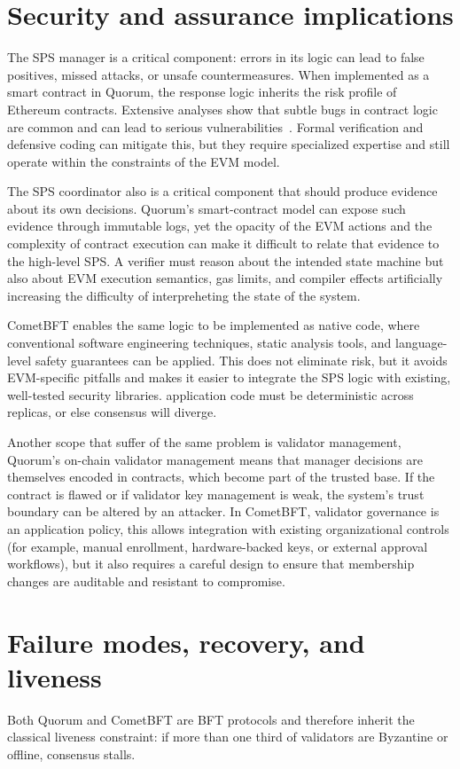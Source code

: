 \section{Security and assurance implications}
The SPS manager is a critical component: errors in its logic can lead to false positives, missed attacks, or unsafe countermeasures. When implemented as a smart contract in Quorum, the response logic inherits the risk profile of Ethereum contracts. Extensive analyses show that subtle bugs in contract logic are common and can lead to serious vulnerabilities~\cite{atzei2017survey, kushwaha2022systematic}. Formal verification and defensive coding can mitigate this, but they require specialized expertise and still operate within the constraints of the EVM model.

 The SPS coordinator also is a critical component that should produce evidence about its own decisions. Quorum's smart-contract model can expose such evidence through immutable logs, yet the opacity of the EVM actions and the complexity of contract execution can make it difficult to relate that evidence to the high-level SPS. A verifier must reason about the intended state machine but also about EVM execution semantics, gas limits, and compiler effects artificially increasing the difficulty of interpreheting the state of the system.

CometBFT enables the same logic to be implemented as native code, where conventional software engineering techniques, static analysis tools, and language-level safety guarantees can be applied. This does not eliminate risk, but it avoids EVM-specific pitfalls and makes it easier to integrate the SPS logic with existing, well-tested security libraries. application code must be deterministic across replicas, or else consensus will diverge.

Another scope that suffer of the same problem is validator management, Quorum's on-chain validator management means that manager decisions are themselves encoded in contracts, which become part of the trusted base. If the contract is flawed or if validator key management is weak, the system's trust boundary can be altered by an attacker. In CometBFT, validator governance is an application policy, this allows integration with existing organizational controls (for example, manual enrollment, hardware-backed keys, or external approval workflows), but it also requires a careful design to ensure that membership changes are auditable and resistant to compromise.

\section{Failure modes, recovery, and liveness}
Both Quorum and CometBFT are BFT protocols and therefore inherit the classical liveness constraint: if more than one third of validators are Byzantine or offline, consensus stalls. 

